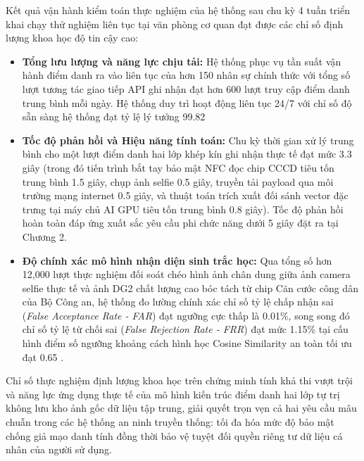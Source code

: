 ﻿\documentclass[../DoAn.tex]{subfiles}
\begin{document}
Kết quả vận hành kiểm toán thực nghiệm của hệ thống sau chu kỳ 4 tuần triển khai chạy thử nghiệm liên tục tại văn phòng cơ quan đạt được các chỉ số định lượng khoa học độ tin cậy cao:
\begin{itemize}
    \item \textbf{Tổng lưu lượng và năng lực chịu tải:} Hệ thống phục vụ tần suất vận hành điểm danh ra vào liên tục của hơn 150 nhân sự chính thức với tổng số lượt tương tác giao tiếp API ghi nhận đạt hơn 600 lượt truy cập điểm danh trung bình mỗi ngày. Hệ thống duy trì hoạt động liên tục 24/7 với chỉ số độ sẵn sàng hệ thống đạt tỷ lệ lý tưởng 99.82%
    \item \textbf{Tốc độ phản hồi và Hiệu năng tính toán:} Chu kỳ thời gian xử lý trung bình cho một lượt điểm danh hai lớp khép kín ghi nhận thực tế đạt mức 3.3 giây (trong đó tiến trình bắt tay bảo mật NFC đọc chip CCCD tiêu tốn trung bình 1.5 giây, chụp ảnh selfie 0.5 giây, truyền tải payload qua môi trường mạng internet 0.5 giây, và thuật toán trích xuất đối sánh vector đặc trưng tại máy chủ AI GPU tiêu tốn trung bình 0.8 giây). Tốc độ phản hồi hoàn toàn đáp ứng xuất sắc yêu cầu phi chức năng dưới 5 giây đặt ra tại Chương 2.
    \item \textbf{Độ chính xác mô hình nhận diện sinh trắc học:} Qua tổng số hơn 12,000 lượt thực nghiệm đối soát chéo hình ảnh chân dung giữa ảnh camera selfie thực tế và ảnh DG2 chất lượng cao bóc tách từ chip Căn cước công dân của Bộ Công an, hệ thống đo lường chính xác chỉ số tỷ lệ chấp nhận sai (\textit{False Acceptance Rate - FAR}) đạt ngưỡng cực thấp là 0.01\%, song song đó chỉ số tỷ lệ từ chối sai (\textit{False Rejection Rate - FRR}) đạt mức 1.15\% tại cấu hình điểm số ngưỡng khoảng cách hình học Cosine Similarity an toàn tối ưu đạt 0.65 \cite{insightface2021}.
\end{itemize}

Chỉ số thực nghiệm định lượng khoa học trên chứng minh tính khả thi vượt trội và năng lực ứng dụng thực tế của mô hình kiến trúc điểm danh hai lớp tự trị không lưu kho ảnh gốc dữ liệu tập trung, giải quyết trọn vẹn cả hai yêu cầu mâu chuẫn trong các hệ thống an ninh truyền thống: tối đa hóa mức độ bảo mật chống giả mạo danh tính đồng thời bảo vệ tuyệt đối quyền riêng tư dữ liệu cá nhân của người sử dụng.
\end{document}
